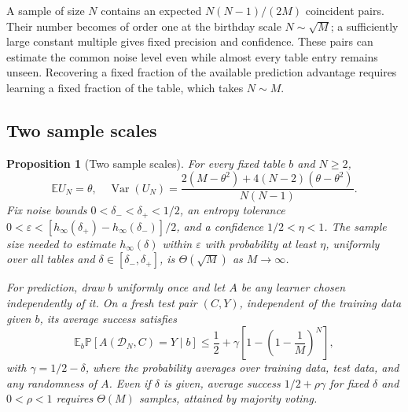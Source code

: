 \documentclass[11pt,a4paper]{article}
\newtheorem{proposition}{Proposition}
\newcommand{\E}{\mathbb{E}}
\newcommand{\PP}{\mathbb{P}}
\begin{document}
A sample of size \(N\) contains an expected \(N(N-1)/(2M)\) coincident pairs. Their number becomes of order one at the birthday scale \(N\sim\sqrt M\); a sufficiently large constant multiple gives fixed precision and confidence. These pairs can estimate the common noise level even while almost every table entry remains unseen. Recovering a fixed fraction of the available prediction advantage requires learning a fixed fraction of the table, which takes \(N\sim M\).

\subsection{Two sample scales}

\begin{proposition}[Two sample scales]
\label{prop:samples}
For every fixed table \(b\) and \(N\ge2\),
\begin{equation}
\E U_N=\theta,\quad
\operatorname{Var}(U_N)=
\frac{2(M-\theta^2)+4(N-2)(\theta-\theta^2)}{N(N-1)}.
\label{eq:variance}
\end{equation}
Fix noise bounds \(0<\delta_-<\delta_+<1/2\), an entropy tolerance
\(0<\varepsilon<[h_\infty(\delta_+)-h_\infty(\delta_-)]/2\), and a confidence \(1/2<\eta<1\). The sample size needed to estimate \(h_\infty(\delta)\) within \(\varepsilon\) with probability at least \(\eta\), uniformly over all tables and \(\delta\in[\delta_-,\delta_+]\), is \(\Theta(\sqrt M)\) as \(M\to\infty\).

For prediction, draw \(b\) uniformly once and let \(A\) be any learner chosen independently of it. On a fresh test pair \((C,Y)\), independent of the training data given \(b\), its average success satisfies
\begin{equation}
\E_b\PP[A(\mathcal D_N,C)=Y\mid b]
\le\frac12+\gamma\left[1-\left(1-\frac1M\right)^{\!N}\right],
\label{eq:coverage}
\end{equation}
with \(\gamma=1/2-\delta\), where the probability averages over training data, test data, and any randomness of \(A\). Even if \(\delta\) is given, average success \(1/2+\rho\gamma\) for fixed \(\delta\) and \(0<\rho<1\) requires \(\Theta(M)\) samples, attained by majority voting.
\end{proposition}
\end{document}
